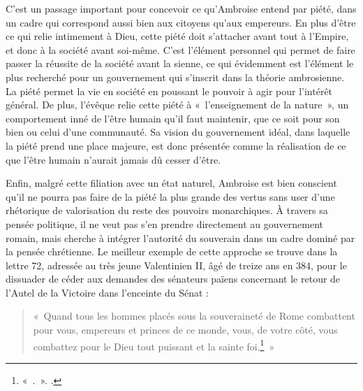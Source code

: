 \bigskip

C'est un passage important pour concevoir ce qu'Ambroise entend par piété, dans un cadre qui correspond aussi bien aux citoyens qu'aux empereurs. En plus d'être ce qui relie intimement à Dieu, cette piété doit s'attacher avant tout à l'Empire, et donc à la société avant soi-même. C'est l'élément personnel qui permet de faire passer la réussite de la société avant la sienne, ce qui évidemment est l'élément le plus recherché pour un gouvernement qui s'inscrit dans la théorie ambrosienne. La piété permet la vie en société en poussant le pouvoir à agir pour l'intérêt général. De plus, l'évêque relie cette piété à «~l'enseignement de la nature~», un comportement inné de l'être humain qu'il faut maintenir, que ce soit pour son bien ou celui d'une communauté. Sa vision du gouvernement idéal, dans laquelle la piété prend une place majeure, est donc présentée comme la réalisation de ce que l'être humain n'aurait jamais dû cesser d'être.

\bigskip

Enfin, malgré cette filiation avec un état naturel,  Ambroise est bien conscient qu'il ne pourra pas faire de la piété la plus grande des vertus sans user d'une rhétorique de valorisation du reste des pouvoirs monarchiques. À travers sa pensée politique, il ne veut pas s'en prendre directement au gouvernement romain, mais cherche à intégrer l'autorité du souverain dans un cadre dominé par la pensée chrétienne. Le meilleur exemple de cette approche se trouve dans la lettre 72, adressée au très jeune Valentinien II, âgé de treize ans en 384, pour le dissuader de céder aux demandes des sénateurs païens concernant le retour de l'Autel de la Victoire dans l'enceinte du Sénat :

\bigskip

\begin{quote}
    «~Quand tous les hommes placés sous la souveraineté de Rome combattent pour vous, empereurs et princes de ce monde, vous, de votre côté, vous combattez pour le Dieu tout puissant et la sainte foi.\footnote{«~.~». \cite[, 1]{ambroise_lettres}.}~»
\end{quote}

\bigskip

